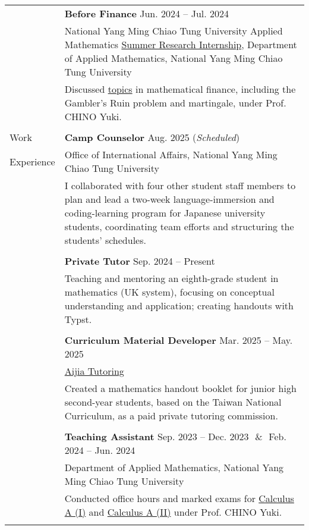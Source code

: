 \documentclass[letterpaper, 11pt]{article}
\begin{document}
\begin{center}
\begin{longtable}{p{0.81in}p{5.88in}}
        & \textbf{Before Finance} \hfill Jun. 2024 -- Jul. 2024\\
        & National Yang Ming Chiao Tung University Applied Mathematics \href{https://teshenglin.github.io/courses/2024_summer_research/}{Summer Research Internship}, Department of Applied Mathematics, National Yang Ming Chiao Tung University\\
        & Discussed \href{https://hackmd.io/@eiken-sc11/B1QcaW3B0}{topics} in mathematical finance, including the Gambler's Ruin problem and martingale, under Prof. CHINO Yuki.\\
        & \\
        

        
        {\textcolor{OliveGreen}{Work}} & \textbf{Camp Counselor} \hfill Aug. 2025 (\textit{Scheduled}) \\
        {\textcolor{OliveGreen}{Experience}} & Office of International Affairs, National Yang Ming Chiao Tung University \\
        & I collaborated with four other student staff members to plan and lead a two-week language-immersion and coding-learning program for Japanese university students, coordinating team efforts and structuring the students' schedules.\\
        & \\

        & \textbf{Private Tutor} \hfill Sep. 2024 -- Present \\
        & Teaching and mentoring an eighth-grade student in mathematics (UK system), focusing on conceptual understanding and application; creating handouts with Typst.\\
        & \\
        
        & \textbf{Curriculum Material Developer} \hfill Mar. 2025 -- May. 2025 \\
        & \href{https://www.instagram.com/aijiatutoring/}{Aijia Tutoring}\\
        & Created a mathematics handout booklet for junior high second-year students, based on the Taiwan National Curriculum, as a paid private tutoring commission.\\
        & \\

        & \textbf{Teaching Assistant}  \hfill Sep. 2023 -- Dec. 2023\ \,\&\ \,Feb. 2024 -- Jun. 2024 \\
        & Department of Applied Mathematics, National Yang Ming Chiao Tung University\\
        & Conducted office hours and marked exams for \href{https://reurl.cc/Djp5jN}{Calculus A (I)} and \href{https://reurl.cc/RqoMez}{Calculus A (II)} under Prof. CHINO Yuki.\\
        & \\


\end{longtable}
\end{center}
\end{document}
